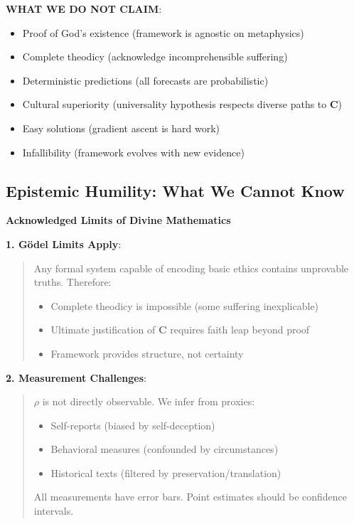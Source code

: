 \documentclass[11pt,a4paper]{article}
\theoremstyle{definition}
\theoremstyle{remark}
\begin{document}
\begin{small}
\begin{enumerate}
\begin{protocol}
\begin{mdframed}[backgroundcolor=yellow!10,linewidth=2pt]
\textbf{WHAT WE DO NOT CLAIM}:
\begin{itemize}[nosep]
    \item Proof of God's existence (framework is agnostic on metaphysics)
    \item Complete theodicy (acknowledge incomprehensible suffering)
    \item Deterministic predictions (all forecasts are probabilistic)
    \item Cultural superiority (universality hypothesis respects diverse paths to \(\mathbf{C}\))
    \item Easy solutions (gradient ascent is hard work)
    \item Infallibility (framework evolves with new evidence)
\end{itemize}
\end{mdframed}

\subsection{Epistemic Humility: What We Cannot Know}

\begin{mdframed}[backgroundcolor=red!10,linewidth=2pt]
\textbf{Acknowledged Limits of Divine Mathematics}

\textbf{1. Gödel Limits Apply}:
\begin{quote}
Any formal system capable of encoding basic ethics contains unprovable truths. Therefore:
\begin{itemize}[nosep]
    \item Complete theodicy is impossible (some suffering inexplicable)
    \item Ultimate justification of \(\mathbf{C}\) requires faith leap beyond proof
    \item Framework provides structure, not certainty
\end{itemize}
\end{quote}

\textbf{2. Measurement Challenges}:
\begin{quote}
\(\rho\) is not directly observable. We infer from proxies:
\begin{itemize}[nosep]
    \item Self-reports (biased by self-deception)
    \item Behavioral measures (confounded by circumstances)
    \item Historical texts (filtered by preservation/translation)
\end{itemize}
All measurements have error bars. Point estimates should be confidence intervals.
\end{quote}


\end{mdframed}
\end{protocol}
\end{enumerate}
\end{small}
\end{document}
